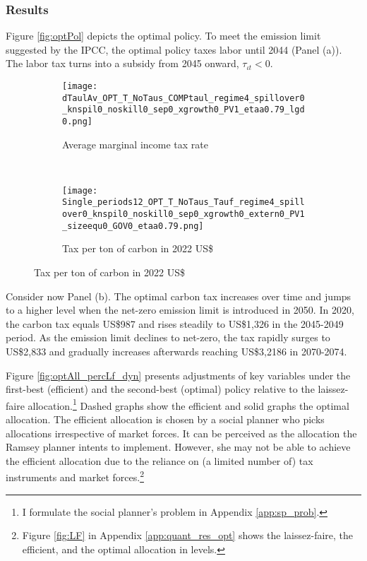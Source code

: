 \subsubsection{Results}\label{sec:optres}
Figure \ref{fig:optPol} depicts the optimal policy.
To meet the emission limit suggested by the IPCC, the optimal policy taxes labor until 2044 (Panel (a)). The labor tax  turns into a subsidy from 2045 onward, $\tau_{\iota t}<0$. 
\begin{figure}[h!!]
	\centering
	\caption{Optimal policy }\label{fig:optPol}
	\begin{subfigure}{0.4\textwidth}
		\caption{Average marginal income tax rate }
		\texttt{[image: dTaulAv\_OPT\_T\_NoTaus\_COMPtaul\_regime4\_spillover0\_knspil0\_noskill0\_sep0\_xgrowth0\_PV1\_etaa0.79\_lgd0.png]}
	\end{subfigure}
\begin{minipage}[]{0.1\textwidth}
	\
\end{minipage}
	\begin{subfigure}{0.4\textwidth}
		\caption{Tax per ton of carbon in 2022 US\$ }
		\texttt{[image: Single\_periods12\_OPT\_T\_NoTaus\_Tauf\_regime4\_spillover0\_knspil0\_noskill0\_sep0\_xgrowth0\_extern0\_PV1\_sizeequ0\_GOV0\_etaa0.79.png]}
	\end{subfigure}
\end{figure} 
Consider now Panel (b). The optimal carbon tax increases over time and jumps to a higher level when the net-zero emission limit is introduced in 2050.
In 2020, the carbon tax equals US\$987 and rises steadily to US\$1,326 in the 2045-2049 period.  As the emission limit declines to net-zero, the tax rapidly surges to US\$2,833 and gradually increases afterwards reaching US\$3,2186 in 2070-2074. 

Figure \ref{fig:optAll_percLf_dyn} presents adjustments of key variables under the first-best (efficient) and the second-best (optimal) policy relative to the laissez-faire allocation.\footnote{ I formulate the social planner's problem in Appendix \ref{app:sp_prob}. }  Dashed graphs show the efficient and solid graphs the optimal allocation.
The efficient allocation is chosen by a social planner who picks allocations irrespective of market forces. It can be perceived as the allocation the Ramsey planner intents to implement. However, she may not be able to achieve the efficient allocation due to the reliance on (a limited number of) tax instruments and market forces.\footnote{ Figure \ref{fig:LF} in Appendix \ref{app:quant_res_opt}  shows the laissez-faire, the efficient, and the optimal allocation in levels.}

